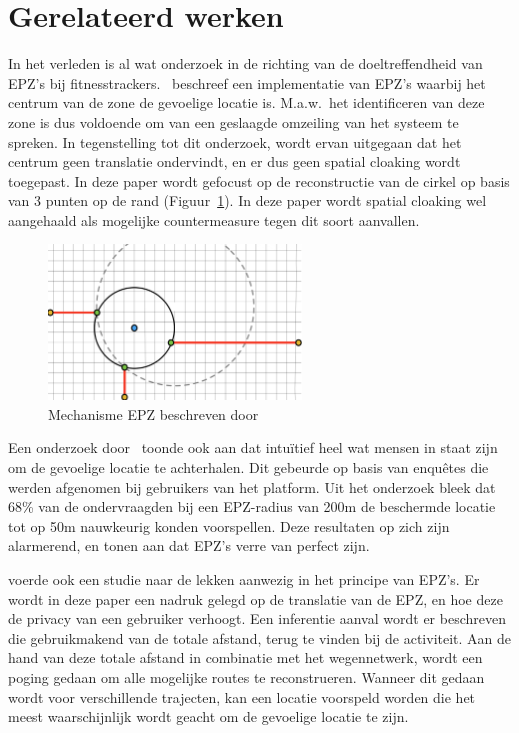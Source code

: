 \section{Gerelateerd werken}
In het verleden is al wat onderzoek in de richting van de doeltreffendheid van
EPZ's bij fitnesstrackers.~\citeauthor{sec18has3:online} beschreef een
implementatie van EPZ's waarbij het centrum van de zone de gevoelige locatie
is. M.a.w.\ het identificeren van deze zone is dus voldoende om van een
geslaagde omzeiling van het systeem te spreken\cite{sec18has3:online}. In
tegenstelling tot dit onderzoek, wordt ervan uitgegaan dat het centrum geen
translatie ondervindt, en er dus geen spatial cloaking wordt toegepast. In deze
paper wordt gefocust op de reconstructie van de cirkel op basis van 3 punten op
de rand (Figuur~\ref{fig:Hassan_EPZ}). In deze paper wordt spatial cloaking wel
aangehaald als mogelijke countermeasure tegen dit soort aanvallen.
\begin{figure}[h]
    \centering
    \includegraphics[width=0.6\textwidth]{fig/EPZ-mechanisme/Hassan.png}
    \caption{Mechanisme EPZ beschreven door \citeauthor{sec18has3:online}}\label{fig:Hassan_EPZ}
\end{figure}

Een onderzoek door~\citeauthor{10.1145/3491102.3502136} toonde ook aan dat
intuïtief heel wat mensen in staat zijn om de gevoelige locatie te achterhalen.
Dit gebeurde op basis van enquêtes die werden afgenomen bij gebruikers van het
platform. Uit het onderzoek bleek dat 68\% van de ondervraagden bij een
EPZ-radius van 200m de beschermde locatie tot op 50m nauwkeurig konden
voorspellen. Deze resultaten op zich zijn alarmerend, en tonen aan dat EPZ's
verre van perfect zijn.

\citeauthor{Dhondt_Pochat_Voulimeneas_Joosen_Volckaert_2022} voerde ook een studie naar de lekken aanwezig in het principe van EPZ's. Er
wordt in deze paper een nadruk gelegd op de translatie van de EPZ, en hoe deze
de privacy van een gebruiker verhoogt. Een inferentie aanval wordt er
beschreven die gebruikmakend van de totale afstand, terug te vinden bij de
activiteit. Aan de hand van deze totale afstand in combinatie met het
wegennetwerk, wordt een poging gedaan om alle mogelijke routes te
reconstrueren. Wanneer dit gedaan wordt voor verschillende trajecten, kan een
locatie voorspeld worden die het meest waarschijnlijk wordt geacht om de
gevoelige locatie te zijn.

